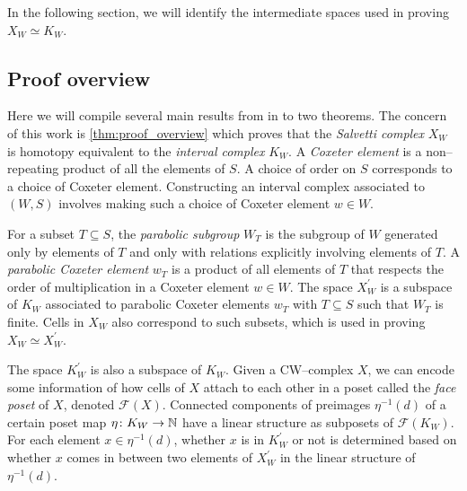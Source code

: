 In the following section, we will identify the intermediate spaces used in proving $X_W \simeq K_W$.

\subsection{Proof overview}
Here we will compile several main results from \cite{paolini_salvetti_kpi1_2021} in to two theorems. The concern of this work is \cref{thm:proof_overview} which proves that the \emph{Salvetti complex} $X_W$ is homotopy equivalent to the \emph{interval complex} $K_W$. A \emph{Coxeter element} is a non--repeating product of all the elements of $S$. A choice of order on $S$ corresponds to a choice of Coxeter element. Constructing an interval complex associated to $(W,S)$ involves making such a choice of Coxeter element $w \in W$.

For a subset $T \subseteq S$, the \emph{parabolic subgroup} $W_T$ is the subgroup of $W$ generated only by elements of $T$ and only with relations explicitly involving elements of $T$. A \emph{parabolic Coxeter element} $w_T$ is a product of all elements of $T$ that respects the order of multiplication in a Coxeter element $w \in W$. The space $X_W^\prime$ is a subspace of $K_W$ associated to parabolic Coxeter elements $w_T$ with $T \subseteq S$ such that $W_T$ is finite. Cells in $X_W$ also correspond to such subsets, which is used in proving $X_W \simeq X_W^\prime$.

The space $K_W^\prime$ is also a subspace of $K_W$. Given a CW--complex $X$, we can encode some information of how cells of $X$ attach to each other in a poset called the \emph{face poset} of $X$, denoted $\mathcal{F}(X)$. Connected components of preimages $\eta^{-1}(d)$ of a certain poset map $\eta \colon K_W \to \mathbb{N}$ have a linear structure as subposets of $\mathcal{F}(K_W)$. For each element $x \in \eta^{-1}(d)$, whether $x$ is in $K_W^\prime$ or not is determined based on whether $x$ comes in between two elements of $X_W^\prime$ in the linear structure of $\eta^{-1}(d)$.

